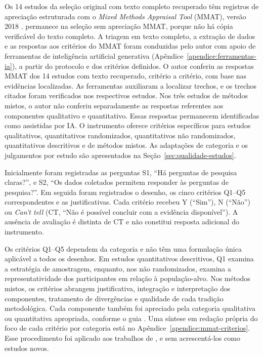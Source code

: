 Os 14 estudos da seleção original com texto completo recuperado têm registros de apreciação estruturada com o \textit{Mixed Methods Appraisal Tool} (MMAT), versão 2018 \cite{MMAT2018}.  permanece na seleção sem apreciação MMAT, porque não há cópia verificável do texto completo. A triagem em texto completo, a extração de dados e as respostas aos critérios do MMAT foram conduzidas pelo autor com apoio de ferramentas de inteligência artificial generativa (Apêndice~\ref{apendice:ferramentas-ia}), a partir do protocolo e dos critérios definidos. O autor conferiu as respostas MMAT dos 14 estudos com texto recuperado, critério a critério, com base nas evidências localizadas. As ferramentas auxiliaram a localizar trechos, e os trechos citados foram verificados nos respectivos estudos. Nos três estudos de métodos mistos, o autor não conferiu separadamente as respostas referentes aos componentes qualitativo e quantitativo. Essas respostas permanecem identificadas como assistidas por IA. O instrumento oferece critérios específicos para estudos qualitativos, quantitativos randomizados, quantitativos não randomizados, quantitativos descritivos e de métodos mistos. As adaptações de categoria e os julgamentos por estudo são apresentados na Seção~\ref{sec:qualidade-estudos}.

Inicialmente foram registradas as perguntas S1, ``Há perguntas de pesquisa claras?'', e S2, ``Os dados coletados permitem responder às perguntas de pesquisa?''. Em seguida foram registrados o desenho, os cinco critérios Q1--Q5 correspondentes e as justificativas. Cada critério recebeu Y (``Sim''), N (``Não'') ou \textit{Can't tell} (CT, ``Não é possível concluir com a evidência disponível''). A ausência de avaliação é distinta de CT e não constitui resposta adicional do instrumento.

Os critérios Q1--Q5 dependem da categoria e não têm uma formulação única aplicável a todos os desenhos. Em estudos quantitativos descritivos, Q1 examina a estratégia de amostragem, enquanto, nos não randomizados, examina a representatividade dos participantes em relação à população-alvo. Nos métodos mistos, os critérios abrangem justificativa, integração e interpretação dos componentes, tratamento de divergências e qualidade de cada tradição metodológica. Cada componente também foi apreciado pela categoria qualitativa ou quantitativa apropriada, conforme o guia \cite{MMATGuide2018}. Uma síntese em redação própria do foco de cada critério por categoria está no Apêndice~\ref{apendice:mmat-criterios}. Esse procedimento foi aplicado aos trabalhos de ,  e  sem acrescentá-los como estudos novos.


